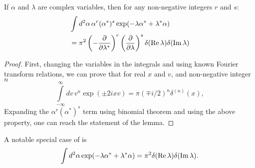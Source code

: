 \begin{lemma}
\label{lmm:c-numbers:fourier-of-moments}
	If $\alpha$ and $\lambda$ are complex variables,
	then for any non-negative integers $r$ and $s$:
	\begin{equation}
	\begin{split}
		& \int d^2\alpha\, \alpha^r (\alpha^*)^s \exp(-\lambda \alpha^* + \lambda^* \alpha) \\
		& = \pi^2
			\left( -\frac{\partial}{\partial \lambda^*} \right)^r
			\left( \frac{\partial}{\partial \lambda} \right)^s
			\delta(\operatorname{Re} \lambda) \delta(\operatorname{Im} \lambda)
	\end{split}
	\end{equation}
\end{lemma}
\begin{proof}
First, changing the variables in the integrals and using known Fourier transform relations, we can prove that for real $x$ and $v$, and non-negative integer $n$
\begin{equation*}
	\int\limits_{-\infty}^{\infty} dv\, v^n \exp(\pm 2 i x v)
	= \pi (\mp i / 2)^n \delta^{(n)}(x),
\end{equation*}
Expanding the $\alpha^r (\alpha^*)^s$ term using binomial theorem and using the above property, one can reach the statement of the lemma.
\end{proof}

A notable special case of  is
\begin{equation*}
	\int d^2\alpha \exp(-\lambda \alpha^* + \lambda^* \alpha)
	= \pi^2 \delta(\operatorname{Re} \lambda) \delta(\operatorname{Im} \lambda).
\end{equation*}

